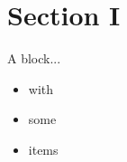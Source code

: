 \documentclass{beamer}
\newenvironment{framesection}[1][\insertsection]{
  \def\insertframesection{#1}
}{
  \def\insertframesection{}
}
\begin{document}
\section*{Section I}

\begin{framesection}%

\begin{frame}{\insertframesection}
\begin{block}{A block...}
    \begin{itemize}
      \item with 
      \item some
      \item items
    \end{itemize}
\end{block}
\end{frame}

\end{framesection}
\end{document}
